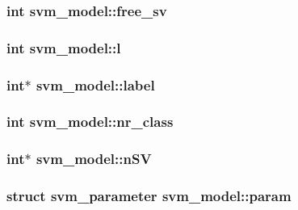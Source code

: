 \subsubsection[{free\+\_\+sv}]{\setlength{\rightskip}{0pt plus 5cm}int svm\+\_\+model\+::free\+\_\+sv}\hypertarget{structsvm__model_a2ae57ce1fa43497d151aff26c21a13a1}{}\label{structsvm__model_a2ae57ce1fa43497d151aff26c21a13a1}
\subsubsection[{l}]{\setlength{\rightskip}{0pt plus 5cm}int svm\+\_\+model\+::l}\hypertarget{structsvm__model_ab858d7eed0bd3cc4c33c094872643d0a}{}\label{structsvm__model_ab858d7eed0bd3cc4c33c094872643d0a}
\subsubsection[{label}]{\setlength{\rightskip}{0pt plus 5cm}int$\ast$ svm\+\_\+model\+::label}\hypertarget{structsvm__model_ac66d192809e92b95875bdf8ebb749060}{}\label{structsvm__model_ac66d192809e92b95875bdf8ebb749060}
\subsubsection[{nr\+\_\+class}]{\setlength{\rightskip}{0pt plus 5cm}int svm\+\_\+model\+::nr\+\_\+class}\hypertarget{structsvm__model_a5af6e0cfb063e8aac03c99aa9d319116}{}\label{structsvm__model_a5af6e0cfb063e8aac03c99aa9d319116}
\subsubsection[{n\+SV}]{\setlength{\rightskip}{0pt plus 5cm}int$\ast$ svm\+\_\+model\+::n\+SV}\hypertarget{structsvm__model_a1d342c9b9e5e4a6377862e13123a25ef}{}\label{structsvm__model_a1d342c9b9e5e4a6377862e13123a25ef}
\subsubsection[{param}]{\setlength{\rightskip}{0pt plus 5cm}struct {\bf svm\+\_\+parameter} svm\+\_\+model\+::param}\hypertarget{structsvm__model_a95f43f398a173e63d0ce26911d0a9273}{}\label{structsvm__model_a95f43f398a173e63d0ce26911d0a9273}
